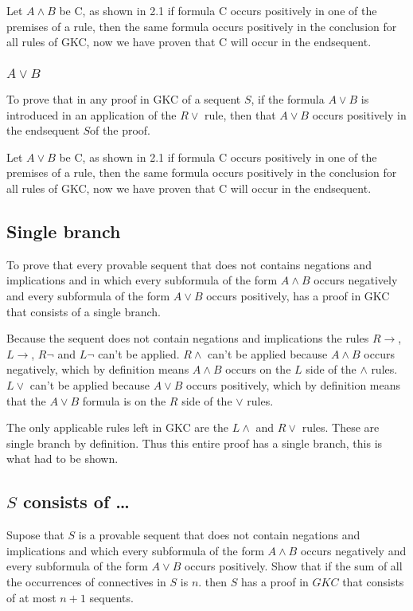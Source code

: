 \documentclass{article}
\begin{document}
Let $A \wedge B$ be C, as shown in 2.1 if formula C occurs positively in
one of the premises of a rule, then the same formula occurs positively in
the conclusion for all rules of GKC, now we have proven that C will
occur in the endsequent.

\subsubsection{$A\vee B$}
To prove that in any proof in GKC of a sequent $S$, if the formula
$A \vee B$ is introduced in an application of the $R\vee$ rule,
then that $A \vee B$ occurs positively in the endsequent $S$of the
proof.

Let $A \vee B$ be C, as shown in 2.1 if formula C occurs positively in
one of the premises of a rule, then the same formula occurs positively in
the conclusion for all rules of GKC, now we have proven that C will
occur in the endsequent.

\subsection{Single branch}
To prove that every provable sequent that does not contains negations and
implications and in which every subformula of the form $A \wedge B$ occurs
negatively and every subformula of the form $A \vee B$ occurs positively,
has a proof in GKC that consists of a single branch.

Because the sequent does not contain negations and implications the rules
$R\to$, $L\to$, $R\neg$ and $L\neg$ can't be applied.
$R\wedge$ can't be applied because $A \wedge B$ occurs negatively,
which by definition means $A \wedge B$ occurs on the $L$ side of the
$\wedge$ rules.
$L\vee$ can't be
applied because $A \vee B$ occurs positively, which by definition means
that the $A \vee B$ formula is on the $R$ side of the $\vee$ rules.

The only applicable rules left in GKC are the $L\wedge$ and $R\vee$ rules.
These are single branch by definition. Thus this entire proof has a single
branch, this is what had to be shown.

\subsection{$S$ consists of \ldots}
Supose that $S$ is a provable sequent that does not contain negations and
implications and which every subformula of the form $A\wedge B$ occurs
negatively and every subformula of the form $A \vee B$ occurs positively.
Show that if the sum of all the occurrences of connectives in $S$ is $n$.
then $S$ has a proof in $GKC$ that consists of at most $n + 1$ sequents.
\end{document}
